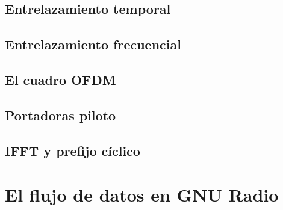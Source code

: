 \subsection{Entrelazamiento temporal}

\subsection{Entrelazamiento frecuencial}

\subsection{El cuadro OFDM}

\subsection{Portadoras piloto}

\subsection{IFFT y prefijo cíclico}

\section{El flujo de datos en GNU Radio}